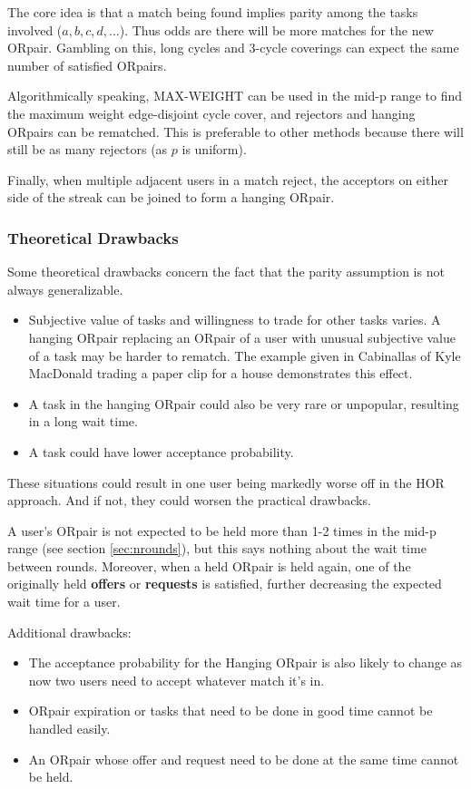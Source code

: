 \documentclass[main.tex]{subfiles}
\begin{document}
The core idea is that a match being found implies parity among the tasks involved ($a, b, c, d, \dots$). Thus odds are there will be more matches for the new ORpair. Gambling on this, long cycles and 3-cycle coverings can expect the same number of satisfied ORpairs.

Algorithmically speaking, MAX-WEIGHT can be used in the mid-p range to find the maximum weight edge-disjoint cycle cover, and rejectors and hanging ORpairs can be rematched. This is preferable to other methods because there will still be as many rejectors (as $p$ is uniform).

Finally, when multiple adjacent users in a match reject, the acceptors on either side of the streak can be joined to form a hanging ORpair.

\subsubsection{Theoretical Drawbacks}\label{sec:theoretical drawbacks}
Some theoretical drawbacks concern the fact that the parity assumption is not always generalizable.

\begin{itemize}
  \item Subjective value of tasks and willingness to trade for other tasks varies. A hanging ORpair replacing an ORpair of a user with unusual subjective value of a task may be harder to rematch. The example given in Cabinallas \cite{Cab0} of Kyle MacDonald trading a paper clip for a house demonstrates this effect.
  \item A task in the hanging ORpair could also be very rare or unpopular, resulting in a long wait time.
  \item A task could have lower acceptance probability.
\end{itemize}

These situations could result in one user being markedly worse off in the HOR approach. And if not, they could worsen the practical drawbacks.

A user's ORpair is not expected to be held more than 1-2 times in the mid-p range (see section \ref{sec:nrounds}), but this says nothing about the wait time between rounds. Moreover, when a held ORpair is held again, one of the originally held \textbf{offers} or \textbf{requests} is satisfied, further decreasing the expected wait time for a user.

Additional drawbacks:
\begin{itemize}
  \item The acceptance probability for the Hanging ORpair is also likely to change as now two users need to accept whatever match it's in.
  \item ORpair expiration or tasks that need to be done in good time cannot be handled easily.
  \item An ORpair whose offer and request need to be done at the same time cannot be held.
\end{itemize}
\end{document}

